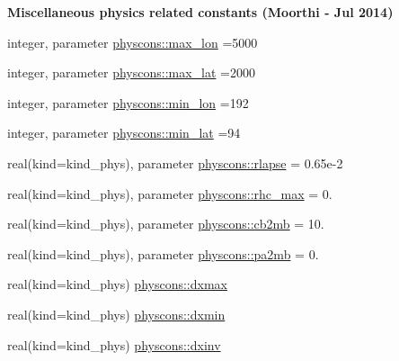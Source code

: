 \begin{Indent}{\bf Miscellaneous physics related constants (Moorthi -\/ Jul 2014)}\par
\begin{DoxyCompactItemize}
\item 
integer, parameter \hyperlink{namespacephyscons_afd0d42b08acf830fce089278841f35d8}{physcons\+::max\+\_\+lon} =5000
\item 
integer, parameter \hyperlink{namespacephyscons_a954d523a6dc3fe558de54a03b584e512}{physcons\+::max\+\_\+lat} =2000
\item 
integer, parameter \hyperlink{namespacephyscons_a058332a27ea45c1188760483078d6472}{physcons\+::min\+\_\+lon} =192
\item 
integer, parameter \hyperlink{namespacephyscons_a2bd1eff655c04ff37fa9dc10d3f2bb94}{physcons\+::min\+\_\+lat} =94
\item 
real(kind=kind\+\_\+phys), parameter \hyperlink{namespacephyscons_a40e396eb1da77e57801ab4d6521aa9d3}{physcons\+::rlapse} = 0.\+65e-\/2
\item 
real(kind=kind\+\_\+phys), parameter \hyperlink{namespacephyscons_abd762e7e22635a2f3d25e58b6bcde1fb}{physcons\+::rhc\+\_\+max} = 0.
\item 
real(kind=kind\+\_\+phys), parameter \hyperlink{namespacephyscons_afee4867dffc4da15248cff2e4ef39992}{physcons\+::cb2mb} = 10.
\item 
real(kind=kind\+\_\+phys), parameter \hyperlink{namespacephyscons_a6da0ad02b40738e185d46ba92f47434e}{physcons\+::pa2mb} = 0.
\item 
real(kind=kind\+\_\+phys) \hyperlink{namespacephyscons_a58cc4eb8ab140d1d56e8e1f2cad4aa93}{physcons\+::dxmax}
\item 
real(kind=kind\+\_\+phys) \hyperlink{namespacephyscons_a0d975826ce89583acdad7f32e028d979}{physcons\+::dxmin}
\item 
real(kind=kind\+\_\+phys) \hyperlink{namespacephyscons_ab94b4700f51149d28ed380c687f36c49}{physcons\+::dxinv}
\end{DoxyCompactItemize}
\end{Indent}
